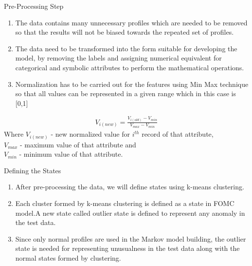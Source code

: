 \documentclass{beamer}
\begin{document}
\begin{frame}{Pre-Processing Step}
\begin{enumerate}
    \item The data contains many unnecessary profiles which are needed to be removed so that the results will not be biased towards the repeated set of profiles.
    \item The data need to be transformed into the form suitable for developing the model, by removing the labels and assigning numerical equivalent for categorical and symbolic attributes to perform the mathematical operations. 
    \item Normalization has to be carried out for the features using Min Max technique so that all values can be represented in a given range which in this case is [0,1]
\end{enumerate}
\begin{align}
    V_{i(new)}=\frac{V_{i(old)}-V_{min}}{V_{max}-V_{min}}
\end{align}
Where $V_{i(new)}$ - new normalized value for $i^{th}$ record of that attribute,\\
$V_{max}$ - maximum value of that attribute and\\
$V_{min}$ - minimum value of that attribute.
\end{frame}

\begin{frame}{Defining the States}
\begin{enumerate}
    \item After pre-processing the data, we will define states using k-means clustering.
    \item Each cluster formed by k-means clustering is defined as a state in FOMC model.A new state called outlier state is defined to represent any anomaly in the test data.
    \item Since only normal profiles are used in the Markov model building, the outlier state is needed for representing unusualness in the test data along with the normal states formed by clustering.
\end{enumerate}
\end{frame}
\end{document}
